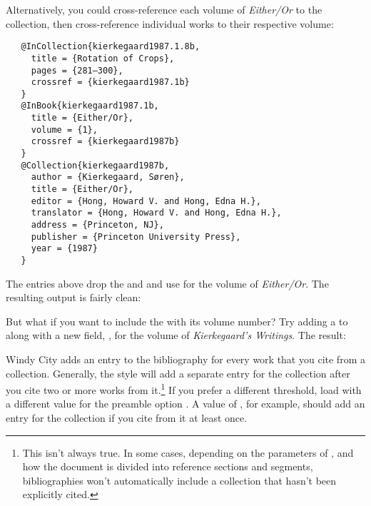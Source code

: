 \documentclass[11pt,letterpaper,oneside]{article}
\begin{document}
\begin{citebib}
\item \cite[290]{kierkegaard1987.1.8a}
\end{citebib}

\noindent Alternatively, you could cross-reference each volume of
\textit{Either/Or} to the collection, then cross-reference
individual works to their respective volume:

\begin{verbatim}
   @InCollection{kierkegaard1987.1.8b,
     title = {Rotation of Crops},
     pages = {281–300},
     crossref = {kierkegaard1987.1b}
   }
   @InBook{kierkegaard1987.1b,
     title = {Either/Or},
     volume = {1},
     crossref = {kierkegaard1987b}
   }
   @Collection{kierkegaard1987b,
     author = {Kierkegaard, Søren},
     title = {Either/Or},
     editor = {Hong, Howard V. and Hong, Edna H.},
     translator = {Hong, Howard V. and Hong, Edna H.},
     address = {Princeton, NJ},
     publisher = {Princeton University Press},
     year = {1987}
   }
\end{verbatim}

\noindent The entries above drop the  and
 and use  for the volume of
\textit{Either/Or}. The resulting output is fairly clean:

\begin{citebib}
\item \cite[290]{kierkegaard1987.1.8b}
\end{citebib}

But what if you want to include the  with its
volume number? Try adding a  to
 along with a new field, , for
the volume of \textit{Kierkegaard's Writings}. The result:

\begin{citebib}
\item \cite[290]{kierkegaard1987.1.8c}
\end{citebib}

Windy City adds an entry to the bibliography for every work that you
cite from a collection. Generally, the style will add a separate entry
for the collection after you cite two or more works from
it.\footnote{This isn't always true. In some cases, depending on the
parameters of , and how the document is divided
into reference sections and segments, bibliographies won't
automatically include a collection that hasn't been explicitly cited.}
If you prefer a different threshold, load \biblatex with a different
value for the preamble option . A value of
, for example, should add an entry for the collection if
you cite from it at least once.
\end{document}
